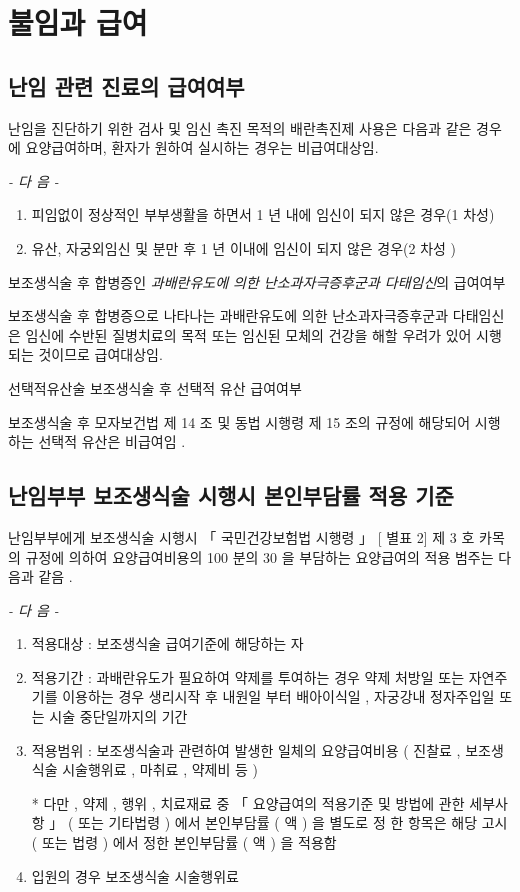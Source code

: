 \section{불임과 급여}
\subsection{난임 관련 진료의 급여여부}
난임을 진단하기 위한 검사 및 임신 촉진 목적의 배란촉진제 사용은 다음과 같은 경우에 요양급여하며, 환자가 원하여 실시하는 경우는 비급여대상임.\par
\emph{- 다 음 -}
\begin{enumerate}[가.]\tightlist
\item 피임없이 정상적인 부부생활을 하면서 1 년 내에 임신이 되지 않은 경우(1 차성)
\item 유산, 자궁외임신 및 분만 후 1 년 이내에 임신이 되지 않은 경우(2 차성 )
\end{enumerate}

\begin{commentbox}
보조생식술 후 합병증인 \emph{과배란유도에 의한 난소과자극증후군과 다태임신}의 급여여부\par
보조생식술 후 합병증으로 나타나는 과배란유도에 의한 난소과자극증후군과 다태임신은 임신에 수반된 질병치료의 목적 또는 임신된 모체의 건강을 해할 우려가 있어 시행되는 것이므로 급여대상임.
\end{commentbox}

\begin{commentbox}{선택적유산술} 
보조생식술 후 선택적 유산 급여여부\par 
보조생식술 후 모자보건법 제 14 조 및 동법 시행령 제 15 조의  규정에  해당되어 시행하는 선택적 유산은 비급여임 . 
\end{commentbox}
\subsection{난임부부 보조생식술 시행시  본인부담률 적용 기준} 
 
난임부부에게 보조생식술 시행시  「 국민건강보험법 시행령 」  [ 별표 2]  제 3 호 카목의 규정에 의하여 요양급여비용의  100 분의  30 을 부담하는 요양급여의 적용 범주는 다음과 같음 . \par
\emph{-  다 음  -}\par 
\begin{enumerate}[가.]\tightlist
\item 적용대상 :  보조생식술 급여기준에 해당하는 자 
\item 적용기간 :  과배란유도가 필요하여  약제를  투여하는 경우 약제  처방일 또는 자연주기를 이용하는 경우  생리시작 후 내원일 부터 배아이식일 ,  자궁강내  정자주입일 또는 시술 중단일까지의 기간 
\item 적용범위 :  보조생식술과 관련하여 발생한 일체의 요양급여비용 ( 진찰료 ,  보조생식술 시술행위료 ,  마취료 ,  약제비 등 ) \par
 *  다만 ,  약제 ,  행위 ,  치료재료 중  「 요양급여의 적용기준  및  방법에 관한 세부사항 」 ( 또는 기타법령 ) 에서 본인부담률 ( 액 ) 을 별도로  정 한 항목은 해당 고시 ( 또는 법령 ) 에서 정한  본인부담률 ( 액 ) 을 적용함 
\item 입원의 경우 보조생식술 시술행위료 
\end{enumerate} 

